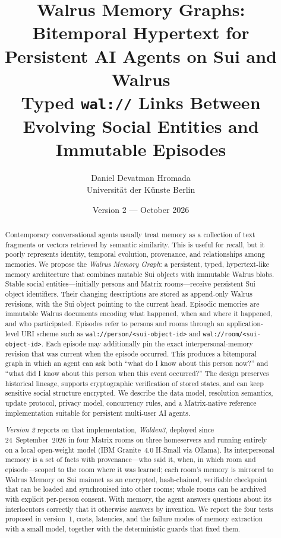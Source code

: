 \documentclass[11pt]{article}
\title{\textbf{Walrus Memory Graphs: Bitemporal Hypertext for Persistent AI Agents on Sui and Walrus}\\
\large Typed \texttt{wal://} Links Between Evolving Social Entities and Immutable Episodes}
\author{Daniel Devatman Hromada\\\small Universit\"at der K\"unste Berlin}
\date{Version 2 --- October 2026}
\begin{document}
\maketitle

\begin{abstract}
Contemporary conversational agents usually treat memory as a collection of text fragments or vectors retrieved by semantic similarity. This is useful for recall, but it poorly represents identity, temporal evolution, provenance, and relationships among memories. We propose the \emph{Walrus Memory Graph}: a persistent, typed, hypertext-like memory architecture that combines mutable Sui objects with immutable Walrus blobs. Stable social entities---initially persons and Matrix rooms---receive persistent Sui object identifiers. Their changing descriptions are stored as append-only Walrus revisions, with the Sui object pointing to the current head. Episodic memories are immutable Walrus documents encoding what happened, when and where it happened, and who participated. Episodes refer to persons and rooms through an application-level URI scheme such as \texttt{wal://person/<sui-object-id>} and \texttt{wal://room/<sui-object-id>}. Each episode may additionally pin the exact interpersonal-memory revision that was current when the episode occurred. This produces a bitemporal graph in which an agent can ask both ``what do I know about this person now?'' and ``what did I know about this person when this event occurred?'' The design preserves historical lineage, supports cryptographic verification of stored states, and can keep sensitive social structure encrypted. We describe the data model, resolution semantics, update protocol, privacy model, concurrency rules, and a Matrix-native reference implementation suitable for persistent multi-user AI agents.

\smallskip
\noindent\emph{Version 2} reports on that implementation, \emph{Walden3}, deployed since 24~September~2026 in four Matrix rooms on three homeservers and running entirely on a local open-weight model (IBM Granite~4.0 H-Small via Ollama). Its interpersonal memory is a set of facts with provenance---who said it, when, in which room and episode---scoped to the room where it was learned; each room's memory is mirrored to Walrus Memory on Sui mainnet as an encrypted, hash-chained, verifiable checkpoint that can be loaded and synchronised into other rooms; whole rooms can be archived with explicit per-person consent. With memory, the agent answers questions about its interlocutors correctly that it otherwise answers by invention. We report the four tests proposed in version~1, costs, latencies, and the failure modes of memory extraction with a small model, together with the deterministic guards that fixed them.
\end{abstract}
\end{document}
